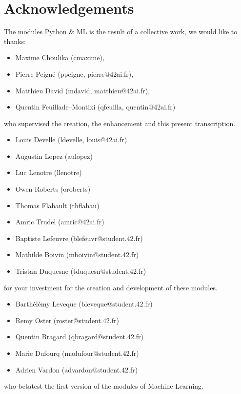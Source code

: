 \documentclass{42-en}
\begin{document}
\section*{Acknowledgements}
The modules Python \& ML is the result of a collective work, we would like to thanks:
\begin{itemize}
  \item Maxime Choulika (cmaxime),
  \item Pierre Peigné (ppeigne, pierre@42ai.fr),
  \item Matthieu David (mdavid, matthieu@42ai.fr),
  \item Quentin Feuillade--Montixi (qfeuilla, quentin@42ai.fr)
\end{itemize}
who supervised the creation, the enhancement and this present transcription.

\begin{itemize}
    \item Louis Develle (ldevelle, louis@42ai.fr)
    \item Augustin Lopez (aulopez)
    \item Luc Lenotre (llenotre)
    \item Owen Roberts (oroberts)
    \item Thomas Flahault (thflahau)
    \item Amric Trudel (amric@42ai.fr)
    \item Baptiste Lefeuvre (blefeuvr@student.42.fr)
    \item Mathilde Boivin (mboivin@student.42.fr)
    \item Tristan Duquesne (tduquesn@student.42.fr)
\end{itemize}
for your investment for the creation and development of these modules.

\begin{itemize}
    \item Barthélémy Leveque (bleveque@student.42.fr)
    \item Remy Oster (roster@student.42.fr)
    \item Quentin Bragard (qbragard@student.42.fr)
    \item Marie Dufourq (madufour@student.42.fr)
    \item Adrien Vardon (advardon@student.42.fr)
\end{itemize}
who betatest the first version of the modules of Machine Learning.
\vfill
\doclicenseThis
\end{document}
